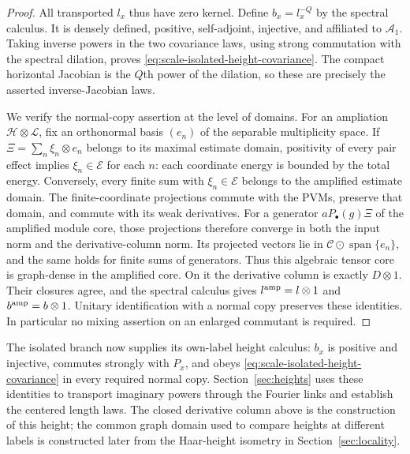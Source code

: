 \begin{proof}
All transported $l_x$ thus have zero kernel.  Define
$b_x=l_x^{-Q}$ by the spectral calculus.  It is densely defined,
positive, self-adjoint, injective, and affiliated to $\mathcal A_1$.
Taking inverse powers in the two covariance laws, using strong
commutation with the spectral dilation, proves
\eqref{eq:scale-isolated-height-covariance}.  The compact horizontal
Jacobian is the $Q$th power of the dilation, so these are precisely
the asserted inverse-Jacobian laws.

We verify the normal-copy assertion at the level of domains.  For an
ampliation $\mathcal H\otimes\mathcal L$, fix an orthonormal basis
$(e_n)$ of the separable multiplicity space.  If
$\Xi=\sum_n\xi_n\otimes e_n$ belongs to its maximal estimate domain,
positivity of every pair effect implies $\xi_n\in\mathscr E$ for each
$n$: each coordinate energy is bounded by the total energy.  Conversely,
every finite sum with $\xi_n\in\mathscr E$ belongs to the amplified
estimate domain.  The finite-coordinate projections commute with the
PVMs, preserve that domain, and commute with its weak derivatives.
For a generator $aP_{\bullet}(g)\Xi$ of the amplified module core,
those projections therefore converge in both the input norm and the
derivative-column norm.  Its projected vectors lie in
$\mathcal C\odot\operatorname{span}\{e_n\}$, and the same holds for finite sums of
generators.  Thus this algebraic tensor core is graph-dense in the
amplified core.  On it the derivative column is exactly $D\otimes1$.
Their closures agree, and the spectral calculus gives
$l^{\rm amp}=l\otimes1$ and $b^{\rm amp}=b\otimes1$.  Unitary
identification with a normal copy preserves these identities.  In
particular no mixing assertion on an enlarged commutant is required.
\end{proof}


The isolated branch now supplies its own-label height calculus:
$b_x$ is positive and injective, commutes strongly with $P_x$, and obeys
\eqref{eq:scale-isolated-height-covariance} in every required normal copy.
Section~\ref{sec:heights} uses these identities to transport imaginary
powers through the Fourier links and establish the centered length laws.
The closed derivative column above is the construction of this height;
the common graph domain used to compare heights at different labels is
constructed later from the Haar-height isometry in
Section~\ref{sec:locality}.
